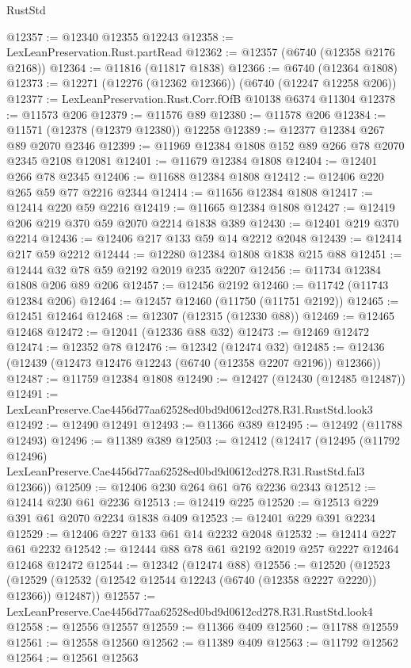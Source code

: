 \begin{lexlean}{RustStd}
\begin{coremodule}
@12357 := @12340 @12355 @12243
@12358 := LexLeanPreservation.Rust.partRead
@12362 := @12357 (@6740 (@12358 @2176 @2168))
@12364 := @11816 (@11817 @1838)
@12366 := @6740 (@12364 @1808)
@12373 := @12271 (@12276 (@12362 @12366)) (@6740 (@12247 @12258 @206))
@12377 := LexLeanPreservation.Rust.Corr.fOfB @10138 @6374 @11304
@12378 := @11573 @206
@12379 := @11576 @89
@12380 := @11578 @206
@12384 := @11571 (@12378 (@12379 @12380)) @12258
@12389 := @12377 @12384 @267 @89 @2070 @2346
@12399 := @11969 @12384 @1808 @152 @89 @266 @78 @2070 @2345 @2108 @12081
@12401 := @11679 @12384 @1808
@12404 := @12401 @266 @78 @2345
@12406 := @11688 @12384 @1808
@12412 := @12406 @220 @265 @59 @77 @2216 @2344
@12414 := @11656 @12384 @1808
@12417 := @12414 @220 @59 @2216
@12419 := @11665 @12384 @1808
@12427 := @12419 @206 @219 @370 @59 @2070 @2214 @1838 @389
@12430 := @12401 @219 @370 @2214
@12436 := @12406 @217 @133 @59 @14 @2212 @2048
@12439 := @12414 @217 @59 @2212
@12444 := @12280 @12384 @1808 @1838 @215 @88
@12451 := @12444 @32 @78 @59 @2192 @2019 @235 @2207
@12456 := @11734 @12384 @1808 @206 @89 @206
@12457 := @12456 @2192
@12460 := @11742 (@11743 @12384 @206)
@12464 := @12457 @12460 (@11750 (@11751 @2192))
@12465 := @12451 @12464
@12468 := @12307 (@12315 (@12330 @88))
@12469 := @12465 @12468
@12472 := @12041 (@12336 @88 @32)
@12473 := @12469 @12472
@12474 := @12352 @78
@12476 := @12342 (@12474 @32)
@12485 := @12436 (@12439 (@12473 @12476 @12243 (@6740 (@12358 @2207 @2196)) @12366))
@12487 := @11759 @12384 @1808
@12490 := @12427 (@12430 (@12485 @12487))
@12491 := LexLeanPreserve.Cae4456d77aa62528ed0bd9d0612cd278.R31.RustStd.look3
@12492 := @12490 @12491
@12493 := @11366 @389
@12495 := @12492 (@11788 @12493)
@12496 := @11389 @389
@12503 := @12412
    (@12417
      (@12495
        (@11792 @12496)
        LexLeanPreserve.Cae4456d77aa62528ed0bd9d0612cd278.R31.RustStd.fal3
        @12366))
@12509 := @12406 @230 @264 @61 @76 @2236 @2343
@12512 := @12414 @230 @61 @2236
@12513 := @12419 @225
@12520 := @12513 @229 @391 @61 @2070 @2234 @1838 @409
@12523 := @12401 @229 @391 @2234
@12529 := @12406 @227 @133 @61 @14 @2232 @2048
@12532 := @12414 @227 @61 @2232
@12542 := @12444 @88 @78 @61 @2192 @2019 @257 @2227 @12464 @12468 @12472
@12544 := @12342 (@12474 @88)
@12556 := @12520
    (@12523 (@12529 (@12532 (@12542 @12544 @12243 (@6740 (@12358 @2227 @2220)) @12366)) @12487))
@12557 := LexLeanPreserve.Cae4456d77aa62528ed0bd9d0612cd278.R31.RustStd.look4
@12558 := @12556 @12557
@12559 := @11366 @409
@12560 := @11788 @12559
@12561 := @12558 @12560
@12562 := @11389 @409
@12563 := @11792 @12562
@12564 := @12561 @12563

\end{coremodule}
\end{lexlean}
